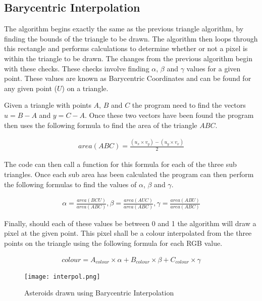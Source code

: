 \documentclass[
	a4paper, %
	10pt, %
]{CSUniSchoolLabReport}
\begin{document}
\subsection{Barycentric Interpolation}
\begin{flushleft}
	The algorithm begins exactly the same as the previous triangle algorithm, by 
	finding the bounds of the triangle to be drawn. The algorithm then loops through
	this rectangle and performs calculations to determine whether or not a pixel is within
	the triangle to be drawn. The changes from the previous algorithm begin with these checks.
	These checks involve finding \(\alpha\), \(\beta\) and \(\gamma\) values for a given point.
	These values are known as Barycentric Coordinates and can be found for any given point (\(U\))
	on a triangle.
\end{flushleft}
\begin{flushleft}
	Given a triangle with points \(A\), \(B\) and \(C\) the program need to find the vectors \(u = B-A\) and \(y = C-A\).
	Once these two vectors have been found the program then uses the following formula to find the area of the triangle \(ABC\).
\end{flushleft}
\begin{align*}
	area(ABC) = \frac{(u_{x} \times v_{y}) - (u_{y} \times v_{x})}{2}
\end{align*}
\begin{flushleft}
	The code can then call a function for this formula for each of the three sub triangles. Once each sub area has 
	been calculated the program can then perform the following formulas to find the values of \(\alpha\), \(\beta\) and \(\gamma\).
\end{flushleft}
\begin{align*}
	\alpha = \frac{area(BCU)}{area(ABC)}, \beta = \frac{area(AUC)}{area(ABC)}, \gamma = \frac{area(ABU)}{area(ABC)}
\end{align*}
\pagebreak
\begin{flushleft}
	Finally, should each of these values be between 0 and 1 the algorithm will draw a pixel at the given point.
	This pixel shall be a colour interpolated from the three points on the triangle using the following formula 
	for each RGB value.
\end{flushleft}
\begin{align*}
	colour = A_{colour} \times \alpha + B_{colour} \times \beta + C_{colour} \times \gamma
\end{align*}
\begin{figure}[H]
	\centering
	\texttt{[image: interpol.png]}
	\caption{Asteroids drawn using Barycentric Interpolation}
\end{figure}
\end{document}
